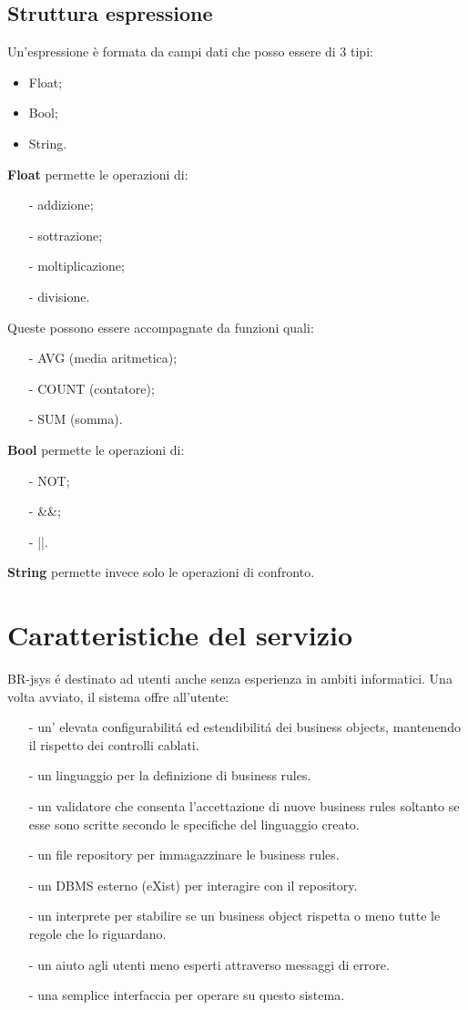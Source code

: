 \subsection{Struttura espressione}
Un'espressione \`e formata da campi dati che posso essere di 3 tipi:
\begin{itemize}
\item Float;
\item Bool;
\item String. 
\end{itemize}
\textbf{Float} permette le operazioni di:
\begin{itemize}
\item[-] addizione;
\item[-] sottrazione;
\item[-] moltiplicazione;
\item[-] divisione.
\end{itemize}
Queste possono essere accompagnate da funzioni quali:
\begin{itemize}
\item[-] AVG (media aritmetica);
\item[-] COUNT (contatore);
\item[-] SUM (somma). 
\end{itemize}
\textbf{Bool} permette le operazioni di:
\begin{itemize}
\item[-] NOT;
\item[-] \&\&;
\item[-] ||.
\end{itemize}
\textbf{String} permette invece solo le operazioni di confronto.
\section{Caratteristiche del servizio}
BR-jsys \'e destinato ad utenti anche senza esperienza in ambiti informatici. Una volta avviato, il sistema offre all'utente:
\begin{itemize}
\item[-] un' elevata configurabilit\'a ed estendibilit\'a dei business objects, mantenendo il rispetto dei controlli cablati.
\item[-] un linguaggio per la definizione di business rules.
\item[-] un validatore che consenta l'accettazione di nuove business rules soltanto se esse sono scritte secondo le specifiche del linguaggio creato.
\item[-] un file repository per immagazzinare le business rules.
\item[-] un DBMS esterno (eXist) per interagire con il repository. 
\item[-] un interprete per stabilire se un business object rispetta o meno tutte le regole che lo riguardano.
\item[-] un aiuto agli utenti meno esperti attraverso  messaggi di errore.
\item[-] una semplice interfaccia per operare su questo sistema.
\end{itemize}

